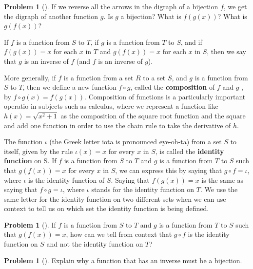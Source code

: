 \documentclass[10pt,]{book}
\newcommand{\terminology}[1]{\textbf{#1}}
\theoremstyle{plain}
\theoremstyle{definition}
\newtheorem{activity}[project]{Problem}
\theoremstyle{definition}
\numberwithin{equation}{chapter}
\begin{document}
%
\begin{activity}[]\marginsymbol[-1em]{} \label{activity-338}
If we reverse all the arrows in the digraph of a bijection \(f\), we get the digraph of another function \(g\). Is \(g\) a bijection? What is \(f(g(x))\)? What is \(g(f(x))\)?%
\end{activity}
If \(f\) is a function from \(S\) to \(T\), if \(g\) is a function from \(T\) to \(S\), and if \(f(g(x))= x\) for each \(x\) in \(T\) and \(g(f(x)) = x\) for each \(x\) in \(S\), then we say that \(g\) is an inverse of \(f\) (and \(f\) is an inverse of \(g\)).%
\par
More generally, if \(f\) is a function from a set \(R\) to a set \(S\), and \(g\) is a function from \(S\) to \(T\), then we define a new function \(f \circ g\), called the \terminology{composition} of \(f\) and \(g\) , by \(f\circ g(x) = f(g(x))\).  Composition of functions is a particularly important operatio in subjects such as calculus, where we represent a function like \(h(x) = \sqrt{x^2 + 1}\) as the composition of the square root function and the square and add one function in order to use the chain rule to take the derivative of \(h\).%
\par
The function \(\iota\) (the Greek letter iota is pronounced eye-oh-ta) from a set \(S\) to itself, given by the rule \(\iota(x) = x\) for every \(x\) in \(S\), is called the \terminology{identity function} on S.  If \(f\) is a function from \(S\) to \(T\) and \(g\) is a function from \(T\) to \(S\) such that \(g(f(x)) = x\) for every \(x\) in \(S\), we can express this by saying that \(g\circ f = \iota\), where \(\iota\) is the identity function of \(S\). Saying that \(f(g(x)) = x\) is the same as saying that \(f\circ g = \iota\), where \(\iota\) stands for the identity function on \(T\).  We use the same letter for the identity function on two different sets when we can use context to tell us on which set the identity function is being defined.%
\begin{activity}[]\marginsymbol[-1em]{} \label{activity-339}
If \(f\) is a function from \(S\) to \(T\) and \(g\) is a function from \(T\) to \(S\) such that \(g(f(x)) = x\), how can we tell from context that \(g\circ f\) is the identity function on \(S\) and not the identity function on \(T\)?%
\end{activity}
\begin{activity}[]\marginsymbol[-1em]{} \label{inversetobijection}
Explain why a function that has an inverse must be a bijection.%
\end{activity}
\end{document}
